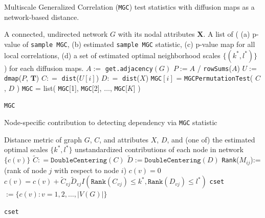 \documentclass[11pt]{article}
\theoremstyle{definition}
\begin{document}
\begin{algorithm}
	\caption{Multiscale Generalized Correlation (\texttt{MGC}) test statistics with diffusion maps as a network-based distance.}
	\begin{algorithmic}[1]
		\Require A connected, undirected network $G$ with its nodal attributes $\mathbf{X}$.
		\Ensure A list of \big(  (a) p-value of \texttt{sample MGC}, (b) estimated \texttt{sample MGC} statistic, (c) p-value map for all local correlations, (d) a set of estimated optimal neighborhood scales $\{  (k^{*}, l^{*}  ) \}$  \big) for each diffusion maps.
		\State $A :=$ \texttt{get.adjacency}$(G)$
		\State $P := A $ / \texttt{rowSums}($A$) 
		\State $U :=$ \texttt{dmap}($P$, $\mathbf{T}$) 
		\Begin
		\State $C : =$  \texttt{dist}($U[i]$) 
		\State $D : =$ \texttt{dist}($X$) 
		\State \texttt{MGC}$[i]$ = \texttt{MGCPermutationTest}( $C$, $D$ ) 
		\End
		\EndFor
		\State \texttt{MGC} = list( \texttt{MGC}[1], \texttt{MGC}[2], $\ldots$, \texttt{MGC}[$K$]  )
		
		\Return \texttt{MGC}
		\EndFunction
	\end{algorithmic}
\end{algorithm}

\begin{algorithm}
	\caption{Node-specific contribution to detecting dependency via \texttt{MGC} statistic}
	\begin{algorithmic}[1]
		\Require Distance metric of graph $G$, $C$, and attributes $X$, $D$, and (one of) the estimated optimal scales $\{ k^{*}, l^{*} \}$ 
		\Ensure  unstandardized contributions of each node in network $\{  c(v) \}$
		\State $\tilde{C} : = \texttt{DoubleCentering}(C)$
		\State $\tilde{D} := \texttt{DoubleCentering}(D)$
		\State \texttt{Rank}($M_{ij}$):= (rank of node $j$ with respect to node $i$)
		 
		\State $c(v) = 0$
		\Begin
		\State $c(v) =  c(v) + \tilde{C}_{vj} \tilde{D}_{v j} I(  \texttt{Rank}(C_{vj})  \leq k^{*}, \texttt{Rank}(D_{vj}) \leq l^{*} )$
		\End
		\EndFor
		\EndFor
		\State \texttt{cset} $:= \{ c(v) : v = 1,2, \ldots , |V(G)|  \}$	
		
		\Return  \texttt{cset}
		\EndFunction
	\end{algorithmic}
\end{algorithm}
\newpage
\end{document}
